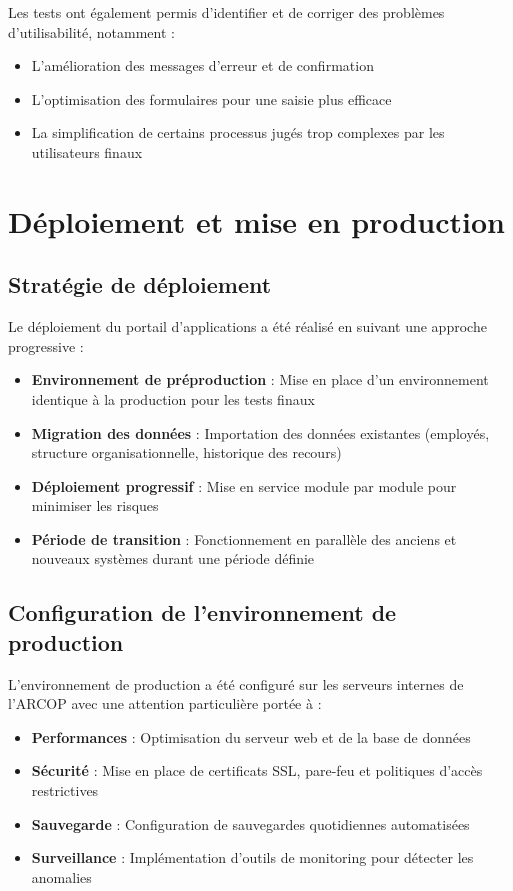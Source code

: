 Les tests ont également permis d'identifier et de corriger des problèmes d'utilisabilité, notamment :

\begin{itemize}
    \item L'amélioration des messages d'erreur et de confirmation
    \item L'optimisation des formulaires pour une saisie plus efficace
    \item La simplification de certains processus jugés trop complexes par les utilisateurs finaux
\end{itemize}

\section{Déploiement et mise en production}

\subsection{Stratégie de déploiement}
Le déploiement du portail d'applications a été réalisé en suivant une approche progressive :

\begin{itemize}
    \item \textbf{Environnement de préproduction} : Mise en place d'un environnement identique à la production pour les tests finaux
    \item \textbf{Migration des données} : Importation des données existantes (employés, structure organisationnelle, historique des recours)
    \item \textbf{Déploiement progressif} : Mise en service module par module pour minimiser les risques
    \item \textbf{Période de transition} : Fonctionnement en parallèle des anciens et nouveaux systèmes durant une période définie
\end{itemize}

\subsection{Configuration de l'environnement de production}
L'environnement de production a été configuré sur les serveurs internes de l'ARCOP avec une attention particulière portée à :

\begin{itemize}
    \item \textbf{Performances} : Optimisation du serveur web et de la base de données
    \item \textbf{Sécurité} : Mise en place de certificats SSL, pare-feu et politiques d'accès restrictives
    \item \textbf{Sauvegarde} : Configuration de sauvegardes quotidiennes automatisées
    \item \textbf{Surveillance} : Implémentation d'outils de monitoring pour détecter les anomalies
\end{itemize}

